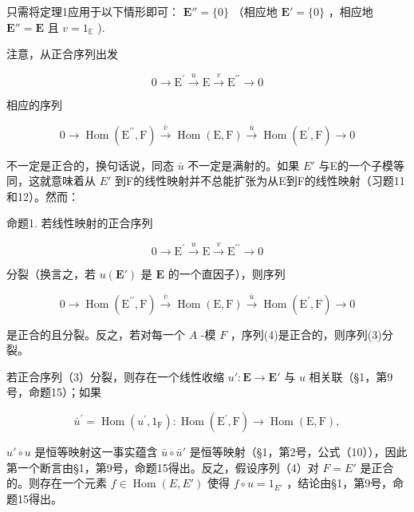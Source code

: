 只需将定理1应用于以下情形即可： \(\mathbf{E}'' = \{0\}\) （相应地 \(\mathbf{E}' = \{0\}\) ，相应地 \(\mathbf{E}'' = \mathbf{E}\) 且 \(v = 1_{\mathbb{E}}\) ).

注意，从正合序列出发

\[
0 \longrightarrow \mathrm{E} ^ {\prime} \stackrel {u} {\longrightarrow} \mathrm{E} \stackrel {v} {\longrightarrow} \mathrm{E} ^ {\prime \prime} \longrightarrow 0
\]

相应的序列

\[
0 \longrightarrow \operatorname{Hom} (\mathrm{E} ^ {\prime \prime}, \mathrm{F}) \stackrel {\bar {v}} {\longrightarrow} \operatorname{Hom} (\mathrm{E}, \mathrm{F}) \stackrel {\bar {u}} {\longrightarrow} \operatorname{Hom} (\mathrm{E} ^ {\prime}, \mathrm{F}) \longrightarrow 0
\]

不一定是正合的，换句话说，同态 \(\bar{u}\) 不一定是满射的。如果 \(E'\) 与E的一个子模等同，这就意味着从 \(E'\) 到F的线性映射并不总能扩张为从E到F的线性映射（习题11和12）。然而：

命题1. 若线性映射的正合序列

\[
0 \longrightarrow \mathrm{E} ^ {\prime} \stackrel {u} {\longrightarrow} \mathrm{E} \stackrel {v} {\longrightarrow} \mathrm{E} ^ {\prime \prime} \longrightarrow 0\tag{3}
\]

分裂（换言之，若 \(u(\mathbf{E}')\) 是 \(\mathbf{E}\) 的一个直因子），则序列

\[
0 \longrightarrow \operatorname{Hom} (\mathrm{E} ^ {\prime \prime}, \mathrm{F}) \stackrel {\bar {v}} {\longrightarrow} \operatorname{Hom} (\mathrm{E}, \mathrm{F}) \stackrel {\bar {u}} {\longrightarrow} \operatorname{Hom} (\mathrm{E} ^ {\prime}, \mathrm{F}) \longrightarrow 0
\]

是正合的且分裂。反之，若对每一个 \(A\) -模 \(F\) ，序列(4)是正合的，则序列(3)分裂。

若正合序列（3）分裂，则存在一个线性收缩 \(u': \mathbf{E} \to \mathbf{E}'\) 与 \(u\) 相关联（§1，第9号，命题15）；如果

\[
\bar {u} ^ {\prime} = \operatorname{Hom} (u ^ {\prime}, 1 _ {\mathrm{F}}): \operatorname{Hom} (\mathrm{E} ^ {\prime}, \mathrm{F}) \rightarrow \operatorname{Hom} (\mathrm{E}, \mathrm{F}),
\]

\(u' \circ u\) 是恒等映射这一事实蕴含 \(\bar{u} \circ \bar{u}'\) 是恒等映射（§1，第2号，公式（10）），因此第一个断言由§1，第9号，命题15得出。反之，假设序列（4）对 \(F = E'\) 是正合的。则存在一个元素 \(f \in \operatorname{Hom}(E, E')\) 使得 \(f \circ u = 1_{E'}\) ，结论由§1，第9号，命题15得出。

